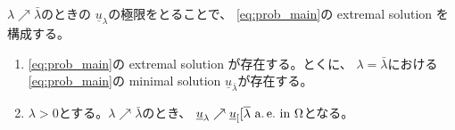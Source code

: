 $\lambda \nearrow \bar{\lambda}$のときの
$\underline{u}_\lambda$の極限をとることで、
\ref{eq:prob_main}の extremal solution を構成する。

\begin{prop} \label{prop:ext_exi}
 \begin{enumerate}[1.]
  \item \ref{eq:prob_main}の extremal solution が存在する。とくに、
        $\lambda = \bar{\lambda}$における\ref{eq:prob_main}の
        minimal solution $\underline{u}_{\bar{\lambda}}$が存在する。
  \item $\lambda > 0$とする。$\lambda \nearrow \bar{\lambda}$のとき、
        $\underline{u}_\lambda \nearrow
        \underline{u}_[[{\overline{\lambda}} ~\text{a.\,e.}~
        \text{in}~
        \Omega$となる。
 \end{enumerate}
\end{prop}

